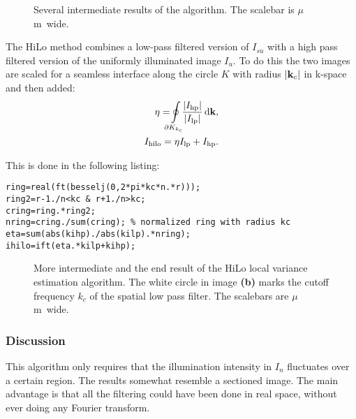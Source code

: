 \begin{figure}[htb]
  \centering
  \caption{Several intermediate results of the algorithm. The scalebar is
    \unit[2]{$\mu$m} wide.}
  \label{fig:hilo1interm}
\end{figure}


The HiLo method combines a low-pass filtered version of $I_{su}$ with
a high pass filtered version of the uniformly illuminated image $I_u$.
To do this the two images are scaled for a seamless interface along
the circle $K$ with radius $\mathopen| \mathbf{k}_c \mathclose|$ in k-space and then added:
\begin{align}
  \eta=\!\!\!\!\ointop_{\partial K_{k_c}}\!\!\!
  \frac{\abs{I_\textrm{hp}}}{\abs{I_\textrm{lp}}}\,\textrm{d}\vect k,\\
  I_\textrm{hilo}=\eta I_\textrm{lp}+I_\textrm{hp}.
\end{align}

This is done in the following listing:
\begin{lstlisting}
ring=real(ft(besselj(0,2*pi*kc*n.*r)));
ring2=r-1./n<kc & r+1./n>kc;
cring=ring.*ring2;
nring=cring./sum(cring); % normalized ring with radius kc
eta=sum(abs(kihp)./abs(kilp).*nring);
ihilo=ift(eta.*kilp+kihp);
\end{lstlisting}

\begin{figure}[htb]
  \centering
  \caption{More intermediate and the end result of the HiLo local
    variance estimation algorithm. The white circle in image {\bf (b)}
    marks the cutoff frequency $k_c$ of the spatial low pass
    filter. The scalebars are \unit[2]{$\mu$m} wide.}
  \label{fig:hilo1interm2}
\end{figure}

\subsubsection*{Discussion}
This algorithm only requires that the illumination intensity in $I_n$
fluctuates over a certain region. The results somewhat resemble a
sectioned image. The main advantage is that all the filtering could
have been done in real space, without ever doing any Fourier
transform.
